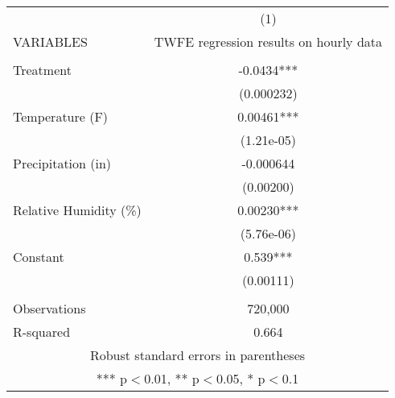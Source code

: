 \begin{tabular}{lc} \hline
 & (1) \\
VARIABLES & TWFE regression results on hourly data \\ \hline
 &  \\
Treatment & -0.0434*** \\
 & (0.000232) \\
Temperature (F) & 0.00461*** \\
 & (1.21e-05) \\
Precipitation (in) & -0.000644 \\
 & (0.00200) \\
Relative Humidity (\%) & 0.00230*** \\
 & (5.76e-06) \\
Constant & 0.539*** \\
 & (0.00111) \\
 &  \\
Observations & 720,000 \\
 R-squared & 0.664 \\ \hline
\multicolumn{2}{c}{ Robust standard errors in parentheses} \\
\multicolumn{2}{c}{ *** p$<$0.01, ** p$<$0.05, * p$<$0.1} \\
\end{tabular}
